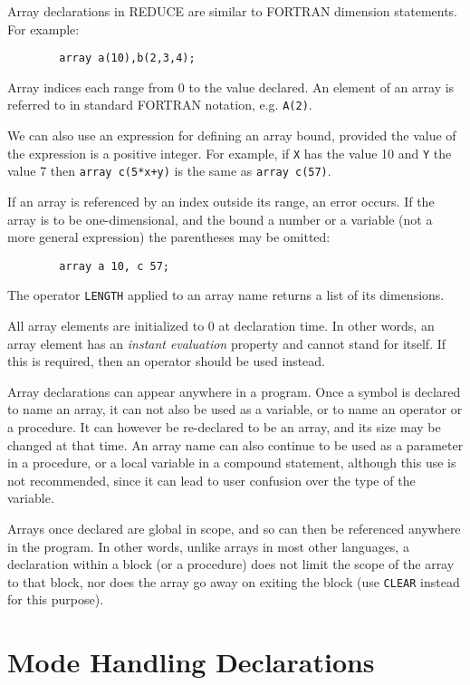 \documentclass[11pt,letterpaper]{book}
\makeatletter
\newcommand{\REDUCE}{REDUCE}
\newcommand{\underscore}{\_}
\newcommand{\ttindex}[1]{{\renewcommand{\_}{\protect\underscore}%
                          \index{#1@{\tt #1}}}}
\makeatother
\begin{document}
Array\ttindex{ARRAY} declarations in {\REDUCE} are similar to FORTRAN
dimension statements.  For example:
{\small\begin{verbatim}
        array a(10),b(2,3,4);
\end{verbatim}}
Array indices each range from 0 to the value declared. An element of an
array is referred to in standard FORTRAN notation, e.g. {\tt A(2)}.

We can also use an expression for defining an array bound, provided the
value of the expression is a positive integer. For example, if {\tt X} has the
value 10 and {\tt Y} the value 7 then
{\tt array c(5*x+y)} is the same as {\tt array c(57)}.

If an array is referenced by an index outside its range, an error occurs.
If the array is to be one-dimensional, and the bound a number or a variable
(not a more general expression) the parentheses may be omitted:
{\small\begin{verbatim}
        array a 10, c 57;
\end{verbatim}}
The operator {\tt LENGTH}\ttindex{LENGTH} applied to an array name
returns a list of its dimensions.

All array elements are initialized to 0 at declaration time. In other words,
an array element has an {\em instant evaluation\/}
property and cannot stand for itself.  If this is required, then an
operator should be used instead.

Array declarations can appear anywhere in a program. Once a symbol is
declared to name an array, it can not also be used as a variable, or to
name an operator or a procedure. It can however be re-declared to be an
array, and its size may be changed at that time. An array name can also
continue to be used as a parameter in a procedure, or a local variable in
a compound statement, although this use is not recommended, since it can
lead to user confusion over the type of the variable.

Arrays once declared are global in scope, and so can then be referenced
anywhere in the program. In other words, unlike arrays in most other
languages, a declaration within a block (or a procedure) does not limit
the scope of the array to that block, nor does the array go away on
exiting the block (use {\tt CLEAR} instead for this purpose).

\section{Mode Handling Declarations}
\end{document}
